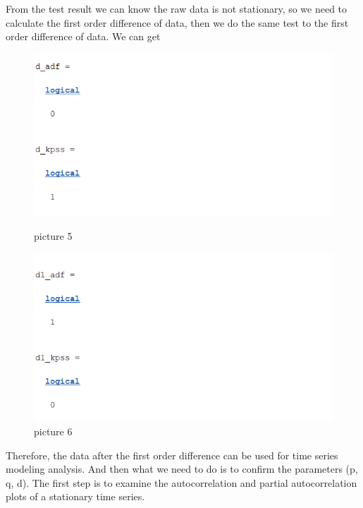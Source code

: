 \documentclass{apmcmthesis}
\begin{document}
From the test result we can know the raw data is not stationary, so we need to calculate the first order difference of data, then we do the same test to the first order difference of data. We can get
\begin{figure}[htbp]
  \begin{minipage}[t]{0.45\linewidth}
    \centering
    \includegraphics[scale=0.5]{order 1.png}
    \caption{picture 5}
  \end{minipage}%
  \begin{minipage}[t]{0.45\linewidth}
    \centering
    \includegraphics[scale=0.5]{order 2.png}
    \caption{picture 6}
  \end{minipage}
\end{figure}

Therefore, the data after the first order difference can be used for time series modeling analysis. And then what we need to do is to confirm the parameters (p, q, d). The first step is to examine the autocorrelation and partial autocorrelation plots of a stationary time series.
\end{document}
